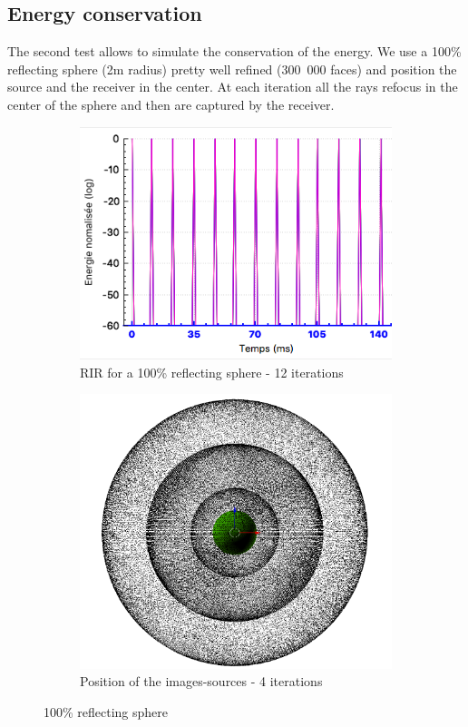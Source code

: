 \documentclass[AMA,STIX1COL]{WileyNJD-v2}
\begin{document}
\subsection {Energy conservation}
The second test allows to simulate the conservation of the energy. We use a 100\% reflecting sphere (2m radius) pretty well refined (300~000 faces) and position the source and the receiver in the center. At each iteration all the rays refocus in the center of the sphere and then are captured by the receiver.
\begin{figure}[h]
\centering
	\begin{subfigure}{0.45\textwidth}
		\includegraphics[width=\linewidth]{test2RIR}
		\caption{RIR for a 100\% reflecting sphere - 12 iterations}
		\label{test2RIR}
	\end{subfigure}
	\quad
	\begin{subfigure}{0.38\textwidth}
		\includegraphics[width=\linewidth]{test2SI}
		\caption{Position of the images-sources - 4 iterations}
		\label{test2SI}
	\end{subfigure}
	\caption{100\% reflecting sphere}
\end{figure}
\end{document}

